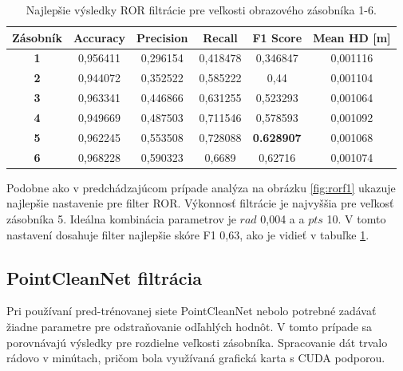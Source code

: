 \begin{table}[h]
	\centering
	\caption{\label{tab:ror_best} Najlepšie výsledky ROR filtrácie pre veľkosti obrazového zásobníka 1-6. }
	\begin{tabular}{cccccc}
		\toprule
		\textbf{Zásobník} & \textbf{Accuracy} & \textbf{Precision} & \textbf{Recall} & \textbf{F1 Score} & \textbf{Mean HD [m]} \\ 
		\midrule
		\textbf{1}           & 0,956411          & 0,296154           & 0,418478        & 0,346847          & 0,001116            \\ 
		\textbf{2}           & 0,944072          & 0,352522           & 0,585222        & 0,44              & 0,001104            \\ 
		\textbf{3}           & 0,963341          & 0,446866           & 0,631255        & 0,523293          & 0,001064           \\
		\textbf{4}           & 0,949669          & 0,487503           & 0,711546        & 0,578593          & 0,001092           \\ 
		\textbf{5}           & 0,962245          & 0,553508           & 0,728088        & \textbf{0.628907}          & 0,001068           \\ 
		\textbf{6}           & 0,968228          & 0,590323           & 0,6689          & 0,62716           & 0,001074           \\ 
		\bottomrule
	\end{tabular}
\end{table}

Podobne ako v predchádzajúcom prípade analýza na obrázku \ref{fig:rorf1} ukazuje najlepšie nastavenie pre filter ROR. Výkonnosť filtrácie je najvyššia pre veľkosť zásobníka 5. Ideálna kombinácia parametrov je $rad$ 0,004 a a $pts$ 10. V tomto nastavení dosahuje filter najlepšie skóre F1 0,63, ako je vidieť v tabuľke \ref{tab:ror_best}.

\subsection{PointCleanNet filtrácia}
Pri používaní pred-trénovanej siete PointCleanNet nebolo potrebné zadávať žiadne parametre pre odstraňovanie odľahlých hodnôt. V tomto prípade sa porovnávajú výsledky pre rozdielne veľkosti zásobníka. Spracovanie dát trvalo rádovo v minútach, pričom bola využívaná grafická karta s CUDA podporou.

